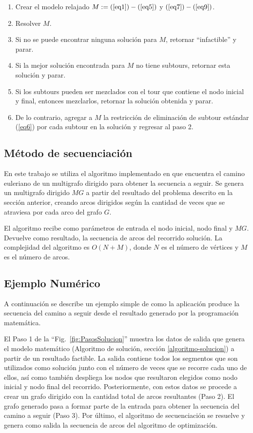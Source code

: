 \documentclass[spanish, conference]{IEEEtran}
\begin{document}
\begin{enumerate}
\item Crear el modelo relajado $M: = (\ref{eq1}) - (\ref{eq5})$ y $(\ref{eq7}) - (\ref{eq9})$.
\item Resolver $M$.
\item Si no se puede encontrar ninguna solución para $M$, retornar ``infactible'' y parar.
\item Si la mejor solución encontrada para $M$ no tiene subtours, retornar esta solución y parar.
\item Si los subtours pueden ser mezclados con el tour que contiene el nodo inicial y final, entonces mezclarlos, retornar la solución obtenida y parar.
\item De lo contrario, agregar a $M$ la restricción de eliminación de subtour estándar (\ref{eq6}) por cada subtour en la solución y regresar al paso 2.
\end{enumerate}

\subsection{Método de secuenciación}

En este trabajo se utiliza el algoritmo implementado en \cite{RiveraHazim2015APath} que encuentra el camino euleriano de un multigrafo dirigido para obtener la secuencia a seguir. Se genera un multigrafo dirigido $MG$ a partir del resultado del problema descrito en la sección anterior, creando arcos dirigidos según la cantidad de veces que se atraviesa por cada arco del grafo $G$. 

El algoritmo recibe como parámetros de entrada el nodo inicial, nodo final y $MG$. Devuelve como resultado, la secuencia de arcos del recorrido solución. La complejidad del algoritmo es $O(N + M)$, donde $N$ es el número de vértices y $M$ es el número de arcos.

\subsection{Ejemplo Numérico}
A continuación se describe un ejemplo simple de como la aplicación produce la secuencia del camino a seguir desde el resultado generado por la programación matemática.

El Paso 1 de la ``Fig.~\ref{fig:PasosSolucion}'' muestra los datos de salida que genera el modelo matemático (Algoritmo  de  solución, sección \ref{algoritmo-solucion}) a partir de un resultado factible. La salida contiene todos los segmentos que son utilizados como solución junto con el número de veces que se recorre cada uno de ellos, así como también despliega los nodos que resultaron elegidos como nodo inicial y nodo final del recorrido. Posteriormente, con estos datos se procede a crear un grafo dirigido con la cantidad total de arcos resultantes (Paso 2). El grafo generado pasa a formar parte de la entrada para obtener la secuencia del camino a seguir (Paso 3). Por último, el algoritmo de secuenciación se resuelve y genera como salida la secuencia de arcos del algoritmo de optimización.
\end{document}
